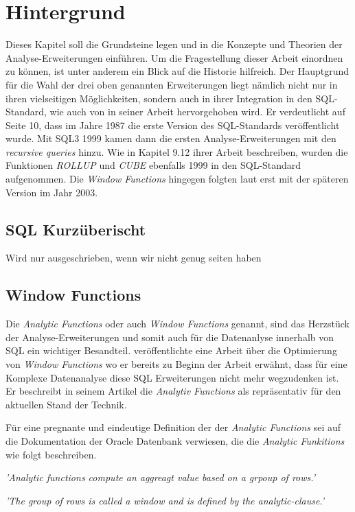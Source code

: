 \chapter{Hintergrund}
Dieses Kapitel soll die Grundsteine legen und in die Konzepte und Theorien der Analyse-Erweiterungen
einführen. Um die Fragestellung dieser Arbeit einordnen zu können, ist unter anderem
ein Blick auf die Historie hilfreich. Der Hauptgrund für die Wahl der drei oben
genannten Erweiterungen liegt nämlich nicht nur in ihren vielseitigen
Möglichkeiten, sondern auch in ihrer Integration in den SQL-Standard, wie auch
von \cite{grust2017advanced} in seiner Arbeit hervorgehoben wird. Er verdeutlicht
auf Seite 10, dass im Jahre 1987 die erste Version des SQL-Standards
veröffentlicht wurde. Mit SQL3 1999 kamen dann die ersten Analyse-Erweiterungen mit
den \textit{recursive queries} hinzu. Wie \cite{melton2001sql} in Kapitel 9.12 ihrer
Arbeit beschreiben, wurden die Funktionen \textit{ROLLUP} und \textit{CUBE}
ebenfalls 1999 in den SQL-Standard aufgenommen. Die \textit{Window Functions}
hingegen folgten laut \cite{grust2017advanced} erst mit der späteren Version im
Jahr 2003.

\section{SQL Kurzüberischt}
Wird nur ausgeschrieben, wenn wir nicht genug seiten haben

\section{Window Functions}
Die \textit{Analytic Functions} oder auch \textit{Window Functions} genannt,
sind das Herzstück der Analyse-Erweiterungen und somit auch für die Datenanlyse
innerhalb von SQL ein wichtiger Besandteil. \cite{cao2012optimization} veröffentlichte
eine Arbeit über die Optimierung von \textit{Window Functions} wo er bereits zu
Beginn der Arbeit erwähnt, dass für eine Komplexe Datenanalyse diese SQL Erweiterungen
nicht mehr wegzudenken ist. Er beschreibt in seinem Artikel die \textit{Analytiv
Functions} als repräsentativ für den aktuellen Stand der Technik.

Für eine pregnante und eindeutige Definition der der \textit{Analytic Functions}
sei auf die Dokumentation der Oracle Datenbank verwiesen, die die \textit{Analytic
Funkitions} wie folgt beschreiben.

\begin{center}
	\textit{ 'Analytic functions compute an aggreagt value based on a grpoup of
	rows.' } \\ \cite{oracle}

	\textit{ 'The group of rows is called a window and is defined by the analytic-clause.'
	} \\ \cite{oracle}
\end{center}


